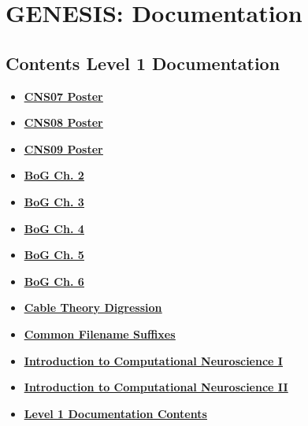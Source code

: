 \documentclass[12pt]{article}
\begin{document}
\section*{GENESIS: Documentation}

\subsection*{Contents Level 1 Documentation}

\begin{itemize}

\item \href{../CNS07/CNS07.pdf}{\bf \underline{CNS07 Poster}}

\item \href{../CNS08/CNS08.pdf}{\bf \underline{CNS08 Poster}}

\item \href{../CNS09/CNS09.pdf}{\bf \underline{CNS09 Poster}}

\item \href{../bog-ch2/bog-ch2.pdf}{\bf \underline{BoG Ch. 2}}

\item \href{../bog-ch3/bog-ch3.pdf}{\bf \underline{BoG Ch. 3}}

\item \href{../bog-ch4/bog-ch4.pdf}{\bf \underline{BoG Ch. 4}}

\item \href{../bog-ch5/bog-ch5.pdf}{\bf \underline{BoG Ch. 5}}

\item \href{../bog-ch6/bog-ch6.pdf}{\bf \underline{BoG Ch. 6}}

\item \href{../cable-theory-digression/cable-theory-digression.pdf}{\bf \underline{Cable Theory Digression}}

\item \href{../common-suffixes/common-suffixes.pdf}{\bf \underline{Common Filename Suffixes}}

\item \href{../compneurosci-1/compneurosci-1.pdf}{\bf \underline{Introduction to Computational Neuroscience I}}

\item \href{../compneurosci-2/compneurosci-2.pdf}{\bf \underline{Introduction to Computational Neuroscience II}}

\item \href{../contents-level1/contents-level1.pdf}{\bf \underline{Level 1 Documentation Contents}}


\end{itemize}
\end{document}
